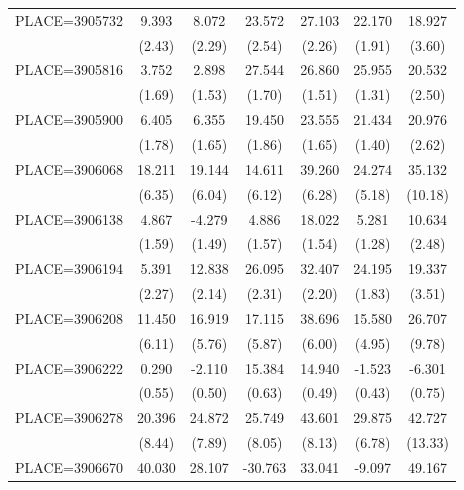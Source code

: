 {\begin{tabular}{l*{6}{c}}
PLACE=3905732       &       9.393&       8.072&      23.572&      27.103&      22.170&      18.927\\
                    &      (2.43)&      (2.29)&      (2.54)&      (2.26)&      (1.91)&      (3.60)\\
PLACE=3905816       &       3.752&       2.898&      27.544&      26.860&      25.955&      20.532\\
                    &      (1.69)&      (1.53)&      (1.70)&      (1.51)&      (1.31)&      (2.50)\\
PLACE=3905900       &       6.405&       6.355&      19.450&      23.555&      21.434&      20.976\\
                    &      (1.78)&      (1.65)&      (1.86)&      (1.65)&      (1.40)&      (2.62)\\
PLACE=3906068       &      18.211&      19.144&      14.611&      39.260&      24.274&      35.132\\
                    &      (6.35)&      (6.04)&      (6.12)&      (6.28)&      (5.18)&     (10.18)\\
PLACE=3906138       &       4.867&      -4.279&       4.886&      18.022&       5.281&      10.634\\
                    &      (1.59)&      (1.49)&      (1.57)&      (1.54)&      (1.28)&      (2.48)\\
PLACE=3906194       &       5.391&      12.838&      26.095&      32.407&      24.195&      19.337\\
                    &      (2.27)&      (2.14)&      (2.31)&      (2.20)&      (1.83)&      (3.51)\\
PLACE=3906208       &      11.450&      16.919&      17.115&      38.696&      15.580&      26.707\\
                    &      (6.11)&      (5.76)&      (5.87)&      (6.00)&      (4.95)&      (9.78)\\
PLACE=3906222       &       0.290&      -2.110&      15.384&      14.940&      -1.523&      -6.301\\
                    &      (0.55)&      (0.50)&      (0.63)&      (0.49)&      (0.43)&      (0.75)\\
PLACE=3906278       &      20.396&      24.872&      25.749&      43.601&      29.875&      42.727\\
                    &      (8.44)&      (7.89)&      (8.05)&      (8.13)&      (6.78)&     (13.33)\\
PLACE=3906670       &      40.030&      28.107&     -30.763&      33.041&      -9.097&      49.167\\

\end{tabular}}
